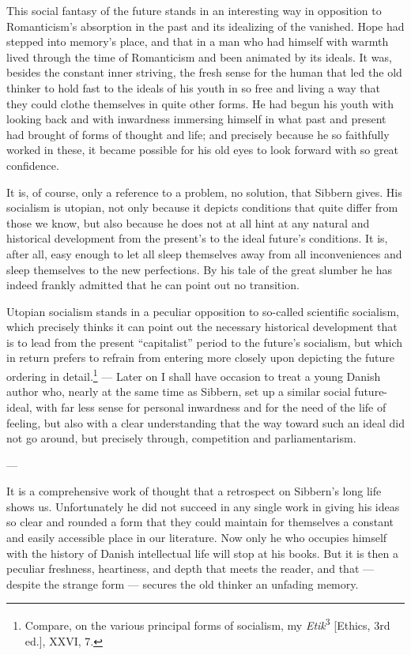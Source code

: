 \documentclass[12pt,a4paper]{book}
\newcommand{\opage}[1]{\marginnote{\footnotesize\textit{[#1]}}}
\begin{document}
This social fantasy of the future stands in an interesting way in opposition to Romanticism's
absorption in the past and its idealizing of the vanished. Hope had stepped into memory's place,
and that in a man who had himself with warmth lived through the time of Romanticism and been
animated by its ideals. It was, besides the constant inner striving, the fresh sense for the human
that led the old thinker to hold fast to the ideals of his youth in so free and living a way that
they could clothe themselves in quite other forms. He had begun his youth with looking back and
with inwardness immersing himself in what past and present had brought of forms of thought and
life; and precisely because he so faithfully worked in these, it became possible for his old eyes
to look forward with so great confidence.

It is, of course, only a reference to a problem, no solution, that Sibbern gives. His socialism is
utopian, not only because it depicts conditions that quite differ from those we know, but also
because he does not at all hint at any natural and historical development from the present's to the
ideal future's conditions. It is, after all, easy enough to let all sleep themselves away from all
inconveniences and sleep themselves to the new perfections. By his tale of the great slumber he has
indeed frankly admitted that he can point out no transition.

Utopian socialism stands in a peculiar opposition to so-called scientific socialism, which
precisely thinks it can point out the necessary historical development that is to lead from the
present ``capitalist'' period to the future's socialism, but which in return prefers to refrain
from entering more closely upon depicting the future ordering in detail.\footnote{Compare, on the
various principal forms of socialism, my \emph{Etik}\textsuperscript{3} [Ethics, 3rd ed.], XXVI, 7.}
--- Later on I shall have occasion to treat a young Danish author who, nearly at the same time as
Sibbern, \opage{117}set up a similar social future-ideal, with far less sense for personal inwardness and for
the need of the life of feeling, but also with a clear understanding that the way toward such an
ideal did not go around, but precisely through, competition and parliamentarism.

\begin{center}---\end{center}

It is a comprehensive work of thought that a retrospect on Sibbern's long life shows us.
Unfortunately he did not succeed in any single work in giving his ideas so clear and rounded a form
that they could maintain for themselves a constant and easily accessible place in our literature.
Now only he who occupies himself with the history of Danish intellectual life will stop at his
books. But it is then a peculiar freshness, heartiness, and depth that meets the reader, and that
--- despite the strange form --- secures the old thinker an unfading memory.
\end{document}
